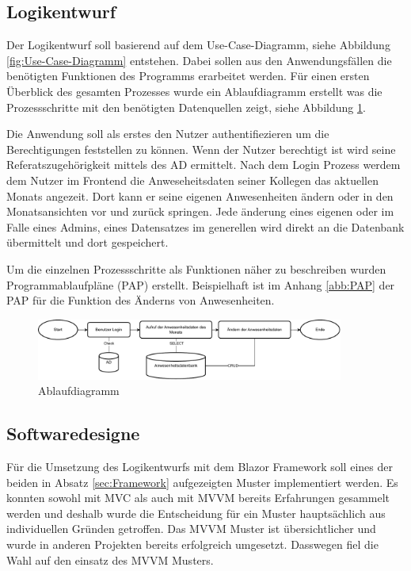 
\subsection{Logikentwurf}
\label{sec:Logikentwurf}
Der Logikentwurf soll basierend auf dem Use-Case-Diagramm, siehe Abbildung \ref*{fig:Use-Case-Diagramm} entstehen. Dabei sollen aus den Anwendungsfällen die benötigten Funktionen des Programms erarbeitet werden. Für einen ersten Überblick des gesamten Prozesses wurde ein Ablaufdiagramm erstellt was die Prozessschritte mit den benötigten Datenquellen zeigt, siehe Abbildung \ref*{abb:Flow}.

Die Anwendung soll als erstes den Nutzer authentifiezieren um die Berechtigungen feststellen zu können. Wenn der Nutzer berechtigt ist wird seine Referatszugehörigkeit mittels des AD ermittelt. Nach dem Login Prozess werdem dem Nutzer im Frontend die Anweseheitsdaten seiner Kollegen das aktuellen Monats angezeit. Dort kann er seine eigenen Anwesenheiten ändern oder in den Monatsansichten vor und zurück springen. Jede änderung eines eigenen oder im Falle eines Admins, eines Datensatzes im generellen wird direkt an die Datenbank übermittelt und dort gespeichert.

Um die einzelnen Prozessschritte als Funktionen näher zu beschreiben wurden Programmablaufpläne (PAP) erstellt. Beispielhaft ist im Anhang \ref{abb:PAP} der PAP für die Funktion des Änderns von Anwesenheiten.

\begin{figure}[htb]
    \centering
    \includegraphics[width=0.9\textwidth,angle=0]{abb/Flow-Diagramm.drawio.pdf}
    \caption[Beschreibung]{Ablaufdiagramm}
    \label{abb:Flow}
\end{figure}

\subsection{Softwaredesigne}
\label{sec:Softwaredesigne}
Für die Umsetzung des Logikentwurfs mit dem Blazor Framework soll eines der beiden in Absatz \ref{sec:Framework}  aufgezeigten Muster implementiert werden. Es konnten sowohl mit MVC als auch mit MVVM bereits Erfahrungen gesammelt werden und deshalb wurde die Entscheidung für ein Muster hauptsächlich aus individuellen Gründen getroffen. Das MVVM Muster ist übersichtlicher und wurde in anderen Projekten bereits erfolgreich umgesetzt. Dasswegen fiel die Wahl auf den einsatz des MVVM Musters.

